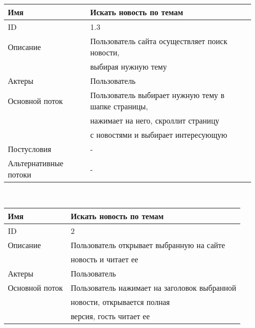 \begin{center}
    \small
    \begin{tabular}{|l|l|}
        \hline
        Имя                   & Искать новость по темам                             \\
        \hline
        ID                    & 1.3                                                 \\
        \hline
        Описание              & Пользователь сайта осуществляет поиск новости,      \\
        & выбирая нужную тему                                 \\
        \hline
        Актеры                & Пользователь                                        \\
        \hline
        Основной поток        & Пользователь выбирает нужную тему в шапке страницы, \\
        & нажимает на него, скроллит страницу                 \\
        & с новостями и выбирает интересующую                 \\
        \hline
        Постусловия           & -                                                   \\
        \hline
        Альтернативные потоки & -                                                   \\
        \hline
    \end{tabular}\\
    \vspace{0.5cm}
    \begin{tabular}{|l|l|}
        \hline
        Имя                   & Искать новость по темам                      \\
        \hline
        ID                    & 2                                            \\
        \hline
        Описание              & Пользователь открывает выбранную на сайте    \\
        & новость и читает ее                          \\
        \hline
        Актеры                & Пользователь                                 \\
        \hline
        Основной поток        & Пользователь нажимает на заголовок выбранной \\
        & новости, открывается полная                  \\
        & версия, гость читает ее                      \\

\end{tabular}
\end{center}
